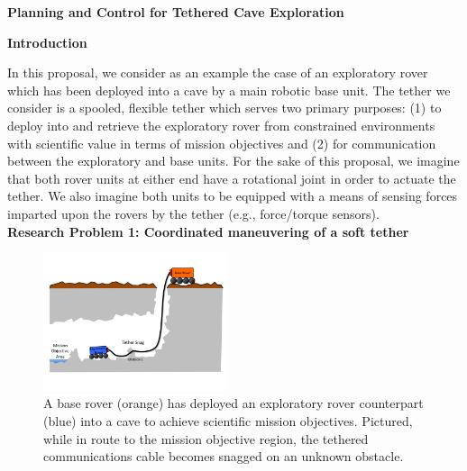 \documentclass[12pt]{article}
\begin{document}
\newpage

\begin{center}
{\bf Planning and Control for Tethered Cave Exploration }

\end{center}



{\bf Introduction \\}

\vspace{-0.15in}In this proposal, we consider as an example the case of an exploratory rover which has been deployed into a cave by a main robotic base unit. The tether we consider is a spooled, flexible tether which serves two primary purposes: (1) to deploy into and retrieve the exploratory rover from constrained environments with scientific value in terms of mission objectives and (2) for communication between the exploratory and base units. For the sake of this proposal, we imagine that both rover units at either end have a rotational joint in order to actuate the tether. We also imagine both units to be equipped with a means of sensing forces imparted upon the rovers by the tether (e.g., force/torque sensors). \\

{\bf Research Problem 1: Coordinated maneuvering of a soft tether \\}
\begin{figure}
  \begin{center}
    \vspace{-0.5in}
    \includegraphics[width=0.48\textwidth, right]{cave_exploration}
  \end{center}
  \vspace{-0.5in}
  \label{fig:cave}
  \caption{A base rover (orange) has deployed an exploratory rover counterpart (blue) into a cave to achieve scientific mission objectives. Pictured, while in route to the mission objective region, the tethered communications cable becomes snagged on an unknown obstacle.}
\end{figure}
\vspace{-0.15in}
\end{document}
